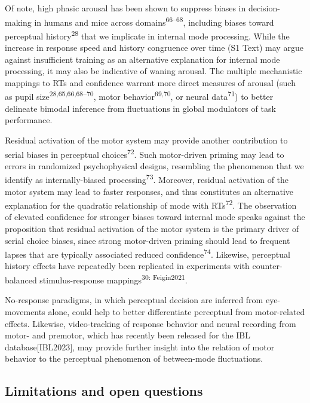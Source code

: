 \documentclass[
]{article}
\begin{document}
Of note, high phasic arousal has been shown to suppress biases in
decision-making in humans and mice across
domains\textsuperscript{66--68}, including biases toward perceptual
history\textsuperscript{28} that we implicate in internal mode
processing. While the increase in response speed and history congruence
over time (S1 Text) may argue against insufficient
training as an alternative explanation for internal mode processing, it
may also be indicative of waning arousal. The multiple mechanistic
mappings to RTs and confidence warrant more direct measures of arousal
(such as pupil size\textsuperscript{28,65,66,68--70}, motor
behavior\textsuperscript{69,70}, or neural data\textsuperscript{71}) to
better delineate bimodal inference from fluctuations in global
modulators of task performance.

Residual activation of the motor system may provide another contribution
to serial biases in perceptual choices\textsuperscript{72}. Such
motor-driven priming may lead to errors in randomized psychophysical
designs, resembling the phenomenon that we identify as internally-biased
processing\textsuperscript{73}. Moreover, residual activation of the
motor system may lead to faster responses, and thus constitutes an
alternative explanation for the quadratic relationship of mode with
RTs\textsuperscript{72}. The observation of elevated confidence for
stronger biases toward internal mode speaks against the proposition that
residual activation of the motor system is the primary driver of serial
choice biases, since strong motor-driven priming should lead to frequent
lapses that are typically associated reduced
confidence\textsuperscript{74}. Likewise, perceptual history effects
have repeatedly been replicated in experiments with counter-balanced
stimulus-response mappings\textsuperscript{30: Feigin2021}.

No-response paradigms, in which perceptual decision are inferred from
eye-movements alone, could help to better differentiate perceptual from
motor-related effects. Likewise, video-tracking of response behavior and
neural recording from motor- and premotor, which has recently been
released for the IBL database{[}IBL2023{]}, may provide further insight
into the relation of motor behavior to the perceptual phenomenon of
between-mode fluctuations.

\hypertarget{limitations-and-open-questions}{%
\subsection{Limitations and open
questions}\label{limitations-and-open-questions}}
\end{document}
